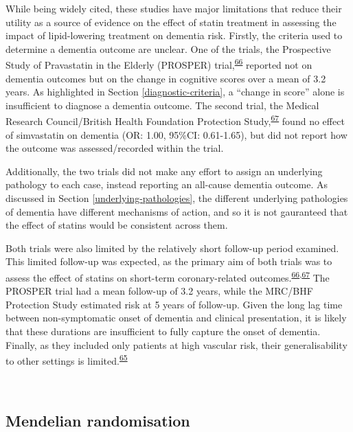 \documentclass[a4paper, twoside]{templates/ociamthesis}
\begin{document}
While being widely cited, these studies have major limitations that reduce their utility as a source of evidence on the effect of statin treatment in assessing the impact of lipid-lowering treatment on dementia risk. Firstly, the criteria used to determine a dementia outcome are unclear. One of the trials, the Prospective Study of Pravastatin in the Elderly (PROSPER) trial,\textsuperscript{\protect\hyperlink{ref-trompet2010}{66}} reported not on dementia outcomes but on the change in cognitive scores over a mean of 3.2 years. As highlighted in Section \ref{diagnostic-criteria}, a ``change in score'' alone is insufficient to diagnose a dementia outcome. The second trial, the Medical Research Council/British Health Foundation Protection Study,\textsuperscript{\protect\hyperlink{ref-heartprotectionstudycollaborativegroup2002}{67}} found no effect of simvastatin on dementia (OR: 1.00, 95\%CI: 0.61-1.65), but did not report how the outcome was assessed/recorded within the trial.

Additionally, the two trials did not make any effort to assign an underlying pathology to each case, instead reporting an all-cause dementia outcome. As discussed in Section \ref{underlying-pathologies}, the different underlying pathologies of dementia have different mechanisms of action, and so it is not gauranteed that the effect of statins would be consistent across them.

Both trials were also limited by the relatively short follow-up period examined. This limited follow-up was expected, as the primary aim of both trials was to assess the effect of statins on short-term coronary-related outcomes.\textsuperscript{\protect\hyperlink{ref-trompet2010}{66},\protect\hyperlink{ref-heartprotectionstudycollaborativegroup2002}{67}} The PROSPER trial had a mean follow-up of 3.2 years, while the MRC/BHF Protection Study estimated risk at 5 years of follow-up. Given the long lag time between non-symptomatic onset of dementia and clinical presentation, it is likely that these durations are insufficient to fully capture the onset of dementia. Finally, as they included only patients at high vascular risk, their generalisability to other settings is limited.\textsuperscript{\protect\hyperlink{ref-mcguinness2016}{65}}

~

\hypertarget{mendelian-randomisation}{%
\subsection{Mendelian randomisation}\label{mendelian-randomisation}}
\end{document}

